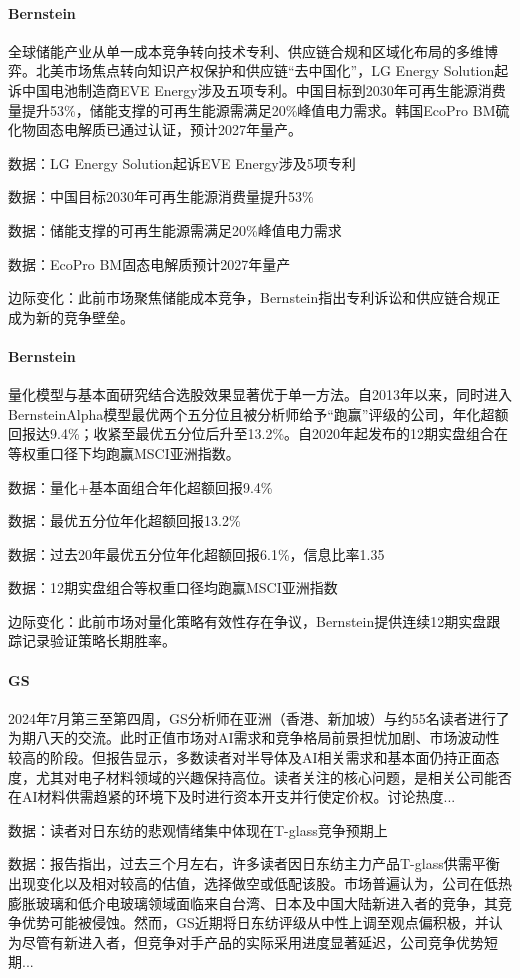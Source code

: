 \documentclass[11pt]{ctexart}
\begin{document}
\paragraph{Bernstein} 全球储能产业从单一成本竞争转向技术专利、供应链合规和区域化布局的多维博弈。北美市场焦点转向知识产权保护和供应链“去中国化”，LG Energy Solution起诉中国电池制造商EVE Energy涉及五项专利。中国目标到2030年可再生能源消费量提升53\%，储能支撑的可再生能源需满足20\%峰值电力需求。韩国EcoPro BM硫化物固态电解质已通过认证，预计2027年量产。
{\small\color{refgray}数据：LG Energy Solution起诉EVE Energy涉及5项专利\par}
{\small\color{refgray}数据：中国目标2030年可再生能源消费量提升53\%\par}
{\small\color{refgray}数据：储能支撑的可再生能源需满足20\%峰值电力需求\par}
{\small\color{refgray}数据：EcoPro BM固态电解质预计2027年量产\par}
{\small\color{refgray}边际变化：此前市场聚焦储能成本竞争，Bernstein指出专利诉讼和供应链合规正成为新的竞争壁垒。\par}
\paragraph{Bernstein} 量化模型与基本面研究结合选股效果显著优于单一方法。自2013年以来，同时进入BernsteinAlpha模型最优两个五分位且被分析师给予“跑赢”评级的公司，年化超额回报达9.4\%；收紧至最优五分位后升至13.2\%。自2020年起发布的12期实盘组合在等权重口径下均跑赢MSCI亚洲指数。
{\small\color{refgray}数据：量化+基本面组合年化超额回报9.4\%\par}
{\small\color{refgray}数据：最优五分位年化超额回报13.2\%\par}
{\small\color{refgray}数据：过去20年最优五分位年化超额回报6.1\%，信息比率1.35\par}
{\small\color{refgray}数据：12期实盘组合等权重口径均跑赢MSCI亚洲指数\par}
{\small\color{refgray}边际变化：此前市场对量化策略有效性存在争议，Bernstein提供连续12期实盘跟踪记录验证策略长期胜率。\par}
\paragraph{GS} 2024年7月第三至第四周，GS分析师在亚洲（香港、新加坡）与约55名读者进行了为期八天的交流。此时正值市场对AI需求和竞争格局前景担忧加剧、市场波动性较高的阶段。但报告显示，多数读者对半导体及AI相关需求和基本面仍持正面态度，尤其对电子材料领域的兴趣保持高位。读者关注的核心问题，是相关公司能否在AI材料供需趋紧的环境下及时进行资本开支并行使定价权。讨论热度...
{\small\color{refgray}数据：读者对日东纺的悲观情绪集中体现在T-glass竞争预期上\par}
{\small\color{refgray}数据：报告指出，过去三个月左右，许多读者因日东纺主力产品T-glass供需平衡出现变化以及相对较高的估值，选择做空或低配该股。市场普遍认为，公司在低热膨胀玻璃和低介电玻璃领域面临来自台湾、日本及中国大陆新进入者的竞争，其竞争优势可能被侵蚀。然而，GS近期将日东纺评级从中性上调至观点偏积极，并认为尽管有新进入者，但竞争对手产品的实际采用进度显著延迟，公司竞争优势短期...\par}
\end{document}
